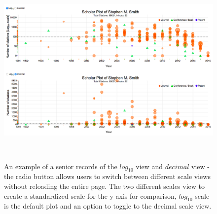 \begin{figure}%
\centering
  \includegraphics[width=1\textwidth]{figures/fig_scaleView-HD}
  \caption{An example of a senior records of the $log_{10}$ view and $decimal$ view - the radio button allows users to switch between different scale views without reloading the entire page. The two different scales view to create a standardized scale for the y-axis for comparison, $log_{10}$ scale is the default plot and an option to toggle to the decimal scale view.}~\label{fig-scale}
\end{figure}


